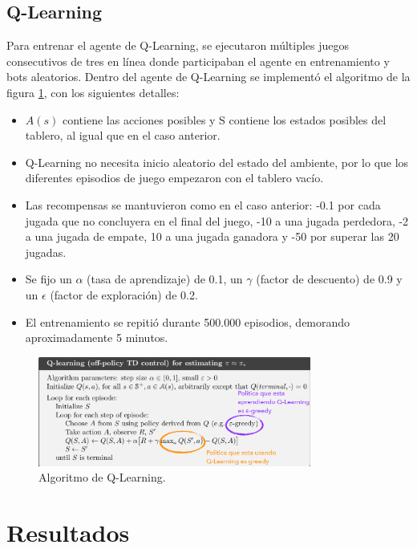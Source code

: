 \subsection{Q-Learning}

Para entrenar el agente de Q-Learning, se ejecutaron múltiples juegos consecutivos de tres en línea donde participaban el agente en entrenamiento y bots aleatorios. Dentro del agente de Q-Learning se implementó el algoritmo de la figura \ref{fig:algorithm_q_learning}, con los siguientes detalles:
\begin{itemize}
    \item \(A(s)\) contiene las acciones posibles y S contiene los estados posibles del tablero, al igual que en el caso anterior.
    \item  Q-Learning no necesita inicio aleatorio del estado del ambiente, por lo que los diferentes episodios de juego empezaron con el tablero vacío.
    \item Las recompensas se mantuvieron como en el caso anterior: -0.1 por cada jugada que no concluyera en el final del juego, -10 a una jugada perdedora, -2 a una jugada de empate, 10 a una jugada ganadora y -50 por superar las 20 jugadas.
    \item Se fijo un \(\alpha\) (tasa de aprendizaje) de 0.1, un \(\gamma\) (factor de descuento) de 0.9 y un \(\epsilon\) (factor de exploración) de 0.2.
    \item El entrenamiento se repitió durante 500.000 episodios, demorando aproximadamente 5 minutos.
\end{itemize} 

\begin{figure}[htbp]
	\centering
	\includegraphics[width=0.8\textwidth]{./Figures/algorithm_q_learning.png}
	\caption{Algoritmo de Q-Learning.}
	\label{fig:algorithm_q_learning}
\end{figure}

\section{Resultados}

